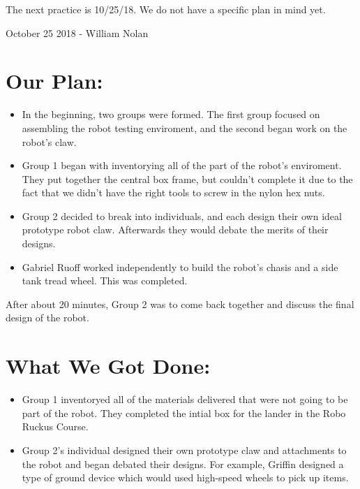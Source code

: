 \documentclass[12pt]{article}
\begin{document}
The next practice is 10/25/18. We do not have a specific plan in mind yet. 

\newpage
\setcounter{section}{0}

October 25 2018 - William Nolan

\section{Our Plan:} %
\begin{itemize}
    \item In the beginning, two groups were formed.  The first group focused on assembling the robot testing enviroment, and the second began work on the robot's claw.
    \item Group 1 began with inventorying all of the part of the robot's enviroment.  They put together the central box frame, but couldn't complete it due to the fact that we didn't have the right tools to screw in the nylon hex nuts.
    \item Group 2 decided to break into individuals, and each design their own ideal prototype robot claw. Afterwards they would debate the merits of their designs.
    \item Gabriel Ruoff worked independently to build the robot's chasis and a side tank tread wheel. This was completed.
\end{itemize}

After about 20 minutes, Group 2 was to come back together and discuss the final design of the robot.

\section{What We Got Done:} %
\begin{itemize}
    \item Group 1 inventoryed all of the materials delivered that were not going to be part of the robot. They completed the intial box for the lander in the Robo Ruckus Course.
    \item Group 2's individual designed their own prototype claw and attachments to the robot and began debated their designs.  For example, Griffin designed a type of ground device which would used high-speed wheels to pick up items.
\end{itemize}
\end{document}

